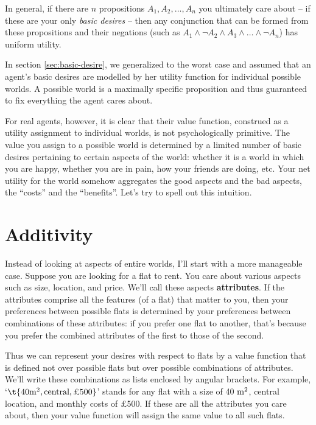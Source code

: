 In general, if there are $n$ propositions $A_1,A_2,\ldots,A_n$ you
ultimately care about -- if these are your only \emph{basic desires}
-- then any conjunction that can be formed from these propositions and
their negations (such as $A_1 \land \neg A_2 \land A_3 \land \ldots
\land \neg A_n$) has uniform utility.

In section \ref{sec:basic-desire}, we generalized to the worst case
and assumed that an agent's basic desires are modelled by her utility
function for individual possible worlds. A possible world is a
maximally specific proposition and thus guaranteed to fix everything
the agent cares about.

For real agents, however, it is clear that their value function,
construed as a utility assignment to individual worlds, is not
psychologically primitive. The value you assign to a possible world is
determined by a limited number of basic desires pertaining to certain
aspects of the world: whether it is a world in which you are happy,
whether you are in pain, how your friends are doing, etc. Your net
utility for the world somehow aggregates the good aspects and the bad
aspects, the ``costs'' and the ``benefits''. Let's try to spell out
this intuition.

\section{Additivity}\label{sec:additivity}

Instead of looking at aspects of entire worlds, I'll start with a more
manageable case. Suppose you are looking for a flat to rent. You care
about various aspects such as size, location, and price. We'll call
these aspects \textbf{attributes}. If the attributes comprise all the
features (of a flat) that matter to you, then your preferences between
possible flats is determined by your preferences between combinations
of these attributes: if you prefer one flat to another, that's because
you prefer the combined attributes of the first to those of the
second.

Thus we can represent your desires with respect to flats by a value
function that is defined not over possible flats but over possible
combinations of attributes. We'll write these combinations as lists
enclosed by angular brackets. For example, `$\t{40 \m^2,
  \text{central}, \text{£500}}$' stands for any flat with a size of 40
$\text{m}^2$, central location, and monthly costs of £500. If these are all
the attributes you care about, then your value function will assign
the same value to all such flats.


